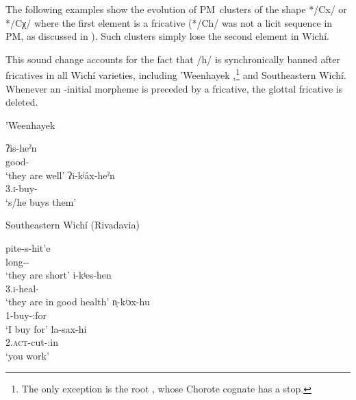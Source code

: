 The following examples show the evolution of PM~clusters of the shape */Cx/ or */Cχ/ where the first element is a fricative (*/Ch/ was not a licit sequence in PM, as discussed in ). Such clusters simply lose the second element in Wichí. 

\begin{exe}
    \ex \killbird
    \ex \finger
    \ex \redquebracho
    \ex \thunder
    \ex \eggits
    \ex \headits
    \ex \meat
\end{exe}

This sound change accounts for the fact that /h/ is synchronically banned after fricatives in all Wichí varieties, including ’Weenhayek \citep[28]{KC94},\footnote{The only exception is the root , whose Chorote cognate  has a stop.} and Southeastern Wichí. Whenever an \mbox{-}initial morpheme is preceded by a fricative, the glottal fricative is deleted.

\ea
'Weenhayek \citep[28, fn. 34]{KC94}\\
    \begin{xlist}
        \ex\gll ʔis-heˀn~\\
                good-\PL\\
                \glt `they are well'
        \ex\gll ʔi-kʲåx-heˀn~\\
                3.{\textsc{i}}-buy-\PL\\
                \glt `s/he buys them'
    \end{xlist}
\z

\ea
Southeastern Wichí (Rivadavia) \citep[43–44]{JT09-th}\\
    \begin{xlist}
        \ex\gll pite-s-hit’e~\\
                long-\PL-\NEG\\
                \glt `they are short'
        \ex\gll i-kʲes-hen~\\
                3.{\textsc{i}}-heal-\PL\\
                \glt `they are in good health'
        \ex\gll n̩-kʲɔx-hu~\\
                1-buy-\APPL:for\\
                \glt `I buy for'
        \ex\gll la-sax-hi~\\
                2.{\textsc{act}}-cut-\APPL:in\\
                \glt `you work'
    \end{xlist}
\z

